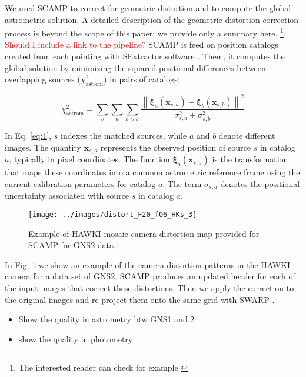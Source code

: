 \documentclass{aa} %
\begin{document}
	We used SCAMP \cite{SCAMP} to correct for geometric distortion and to compute the global astrometric solution. A detailed description of the geometric distortion correction process is beyond the scope of this paper; we provide only a summary here.  \footnote{The interested reader can check for example \cite{2013A&A...554A.101B}}. \textcolor{red}{Should I include a link to the pipeline?} SCAMP is feed on position catalogs created from each pointing with SExtractor software \citep{SEx}. Them, it computes the global solution by minimizing the squared positional differences between overlapping sources ($\chi^2_{\mathrm{astrom}}$) in pairs of catalogs:
	
	\begin{equation}
		\chi^2_{\mathrm{astrom}} = \sum_s \sum_a \sum_{b > a}
		\frac{ \left\| \boldsymbol{\xi}_a(\mathbf{x}_{s,a}) - \boldsymbol{\xi}_b(\mathbf{x}_{s,b}) \right\|^2 }
		{ \sigma_{s,a}^2 + \sigma_{s,b}^2 }
		\label{eq:1}
	\end{equation}
	
	In Eq. \ref{eq:1}, $s$ indexes the matched sources, while $a$ and $b$ denote different images. The quantity $\mathbf{x}_{s,a}$ represents the observed position of source $s$ in catalog $a$, typically in pixel coordinates. The function $\boldsymbol{\xi}_a(\mathbf{x}_{s,a})$ is the transformation that maps these coordinates into a common astrometric reference frame using the current calibration parameters for catalog $a$. The term $\sigma_{s,a}$ denotes the positional uncertainty associated with source $s$ in catalog $a$. 
	
	\begin{figure}
		\centering
		\texttt{[image: ../images/distort\_F20\_f06\_HKs\_3]}
		\caption{Example of HAWKI mosaic camera distortion map provided for SCAMP for GNS2 data.}
		\label{fig:scamp_exm}
	\end{figure}
	
	 In Fig. \ref{fig:scamp_exm} we show an example of the camera distortion patterns in the HAWKI camera for a data set of GNS2. SCAMP produces an updated header for each of the input images that correct these distortions. Then we apply the correction to the original images and re-project them onto the same grid with SWARP \citep{SWARP}.
	 
	 
	 \begin{itemize}
	 	\item Show the quality in astrometry btw GNS1 and 2
	 	\item show the quality in photometry
	 	
	 \end{itemize}
	 
\end{document}
